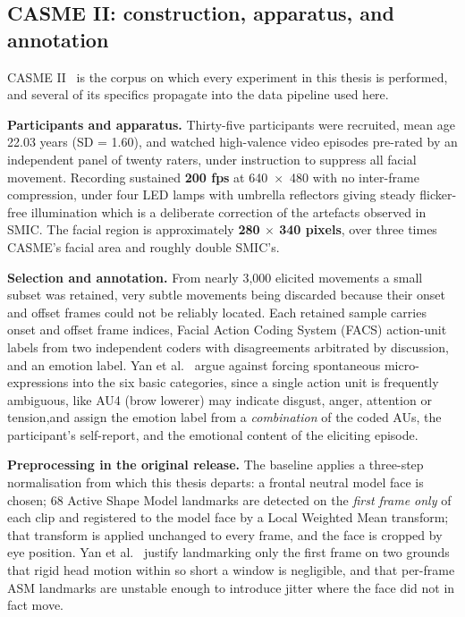 \subsection{CASME II: construction, apparatus, and annotation}
\label{sec:casme2-construction}

CASME II~\cite{yan2014} is the corpus on which every experiment in this thesis is performed, and several of its specifics propagate into the data pipeline used here.

\textbf{Participants and apparatus.} Thirty-five participants were recruited, mean age 22.03 years (SD = 1.60), and watched high-valence video episodes pre-rated by an independent panel of twenty raters, under instruction to suppress all facial movement. Recording sustained \textbf{200 fps} at 640~$\times$~480 with no inter-frame compression, under four LED lamps with umbrella reflectors giving steady flicker-free illumination which is a deliberate correction of the artefacts observed in SMIC. The facial region is approximately \textbf{280 $\times$ 340 pixels}, over three times CASME's facial area and roughly double SMIC's.

\textbf{Selection and annotation.} From nearly 3,000 elicited movements a small subset was retained, very subtle movements being discarded because their onset and offset frames could not be reliably located. Each retained sample carries onset and offset frame indices, Facial Action Coding System (FACS) action-unit labels from two independent coders with disagreements arbitrated by discussion, and an emotion label. Yan et al.~\cite{yan2014} argue against forcing spontaneous micro-expressions into the six basic categories, since a single action unit is frequently ambiguous, like AU4 (brow lowerer) may indicate disgust, anger, attention or tension,and assign the emotion label from a \textit{combination} of the coded AUs, the participant's self-report, and the emotional content of the eliciting episode.

\textbf{Preprocessing in the original release.} The baseline applies a three-step normalisation from which this thesis departs: a frontal neutral model face is chosen; 68 Active Shape Model landmarks are detected on the \textit{first frame only} of each clip and registered to the model face by a Local Weighted Mean transform; that transform is applied unchanged to every frame, and the face is cropped by eye position. Yan et al.~\cite{yan2014} justify landmarking only the first frame on two grounds that rigid head motion within so short a window is negligible, and that per-frame ASM landmarks are unstable enough to introduce jitter where the face did not in fact move.

